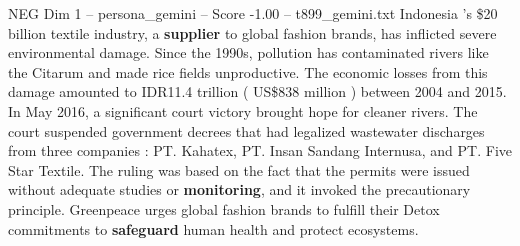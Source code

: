 \begin{textsample}{NEG Dim 1 – persona\_gemini – Score -1.00 – t899\_gemini.txt}  \label{ex:f1_neg_017}
Indonesia 's \$20 billion textile industry, a \textbf{supplier} to global fashion brands, has inflicted severe environmental damage.
Since the 1990s, pollution has contaminated rivers like the Citarum and made rice fields unproductive.
The economic losses from this damage amounted to IDR11.4 trillion ( US\$838 million ) between 2004 and 2015.
In May 2016, a significant court victory brought hope for cleaner rivers.
The court suspended government decrees that had legalized wastewater discharges from three companies : PT.
Kahatex, PT.
Insan Sandang Internusa, and PT.
Five Star Textile.
The ruling was based on the fact that the permits were issued without adequate studies or \textbf{monitoring}, and it invoked the precautionary principle.
Greenpeace urges global fashion brands to fulfill their Detox commitments to \textbf{safeguard} human health and protect ecosystems.

\end{textsample}
